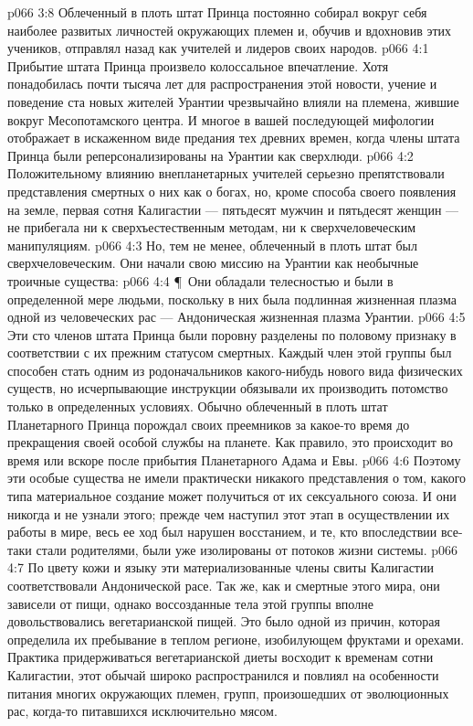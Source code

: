 \vs p066 3:8 Облеченный в плоть штат Принца постоянно собирал вокруг себя наиболее развитых личностей окружающих племен и, обучив и вдохновив этих учеников, отправлял назад как учителей и лидеров своих народов.
\vs p066 4:1 Прибытие штата Принца произвело колоссальное впечатление. Хотя понадобилась почти тысяча лет для распространения этой новости, учение и поведение ста новых жителей Урантии чрезвычайно влияли на племена, жившие вокруг Месопотамского центра. И многое в вашей последующей мифологии отображает в искаженном виде предания тех древних времен, когда члены штата Принца были реперсонализированы на Урантии как сверхлюди.
\vs p066 4:2 Положительному влиянию внепланетарных учителей серьезно препятствовали представления смертных о них как о богах, но, кроме способа своего появления на земле, первая сотня Калигастии --- пятьдесят мужчин и пятьдесят женщин --- не прибегала ни к сверхъестественным методам, ни к сверхчеловеческим манипуляциям.
\vs p066 4:3 Но, тем не менее, облеченный в плоть штат был сверхчеловеческим. Они начали свою миссию на Урантии как необычные троичные существа:
\vs p066 4:4 \P\ \bibnobreakspace Они обладали телесностью и были в определенной мере людьми, поскольку в них была подлинная жизненная плазма одной из человеческих рас --- Андоническая жизненная плазма Урантии.
\vs p066 4:5 Эти сто членов штата Принца были поровну разделены по половому признаку в соответствии с их прежним статусом смертных. Каждый член этой группы был способен стать одним из родоначальников какого\hyp{}нибудь нового вида физических существ, но исчерпывающие инструкции обязывали их производить потомство только в определенных условиях. Обычно облеченный в плоть штат Планетарного Принца порождал своих преемников за какое\hyp{}то время до прекращения своей особой службы на планете. Как правило, это происходит во время или вскоре после прибытия Планетарного Адама и Евы.
\vs p066 4:6 Поэтому эти особые существа не имели практически никакого представления о том, какого типа материальное создание может получиться от их сексуального союза. И они никогда и не узнали этого; прежде чем наступил этот этап в осуществлении их работы в мире, весь ее ход был нарушен восстанием, и те, кто впоследствии все\hyp{}таки стали родителями, были уже изолированы от потоков жизни системы.
\vs p066 4:7 По цвету кожи и языку эти материализованные члены свиты Калигастии соответствовали Андонической расе. Так же, как и смертные этого мира, они зависели от пищи, однако воссозданные тела этой группы вполне довольствовались вегетарианской пищей. Это было одной из причин, которая определила их пребывание в теплом регионе, изобилующем фруктами и орехами. Практика придерживаться вегетарианской диеты восходит к временам сотни Калигастии, этот обычай широко распространился и повлиял на особенности питания многих окружающих племен, групп, произошедших от эволюционных рас, когда\hyp{}то питавшихся исключительно мясом.
